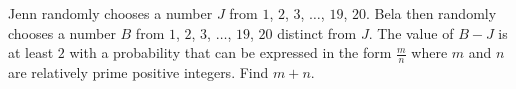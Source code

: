 Jenn randomly chooses a number $J$ from $1$, $2$, $3$, $\ldots$, $19$, $20$. Bela then randomly chooses a number $B$ from $1$, $2$, $3$, $\ldots$, $19$, $20$ distinct from $J$. The value of $B - J$ is at least $2$ with a probability that can be expressed in the form $\frac{m}{n}$ where $m$ and $n$ are relatively prime positive integers. Find $m+n$.
